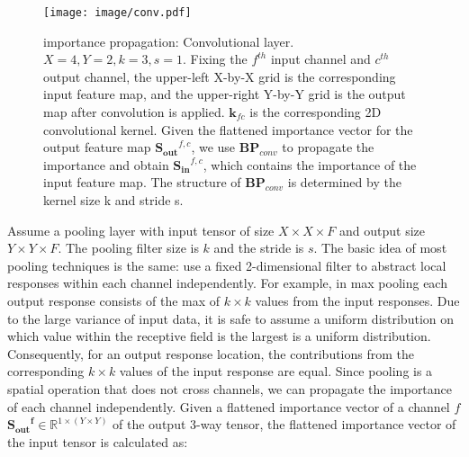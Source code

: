 \documentclass[10pt,twocolumn,letterpaper]{article}
\begin{document}
\begin{figure}[t]
\begin{center}
   \texttt{[image: image/conv.pdf]}
\end{center}
   \caption{importance propagation: Convolutional layer. $X=4, Y=2, k=3, s=1$. Fixing the $f^{th}$ input channel and $c^{th}$ output channel, the upper-left X-by-X grid is the corresponding input feature map, and the upper-right Y-by-Y grid is the output map after convolution is applied. $\mathbf{k}_{fc}$ is the corresponding 2D convolutional kernel. Given the flattened importance vector for the output feature map $\mathbf{S_{out}}^{f,c}$, we use $\mathbf{BP}_{conv}$ to propagate the importance and obtain $\mathbf{S_{in}}^{f,c}$, which contains the importance of the input feature map. The structure of $\mathbf{BP}_{conv}$ is determined by the kernel size k and stride s. }
\label{fig:conv}
\end{figure}%
Assume a pooling layer with input tensor of size $X \times X \times F$ and output size $Y \times Y \times F$.
The pooling filter size is $k$ and the stride is $s$.
The basic idea of most pooling techniques is the same: use a fixed 2-dimensional filter to abstract local responses within each channel independently.
For example, in max pooling each output response consists of the max of $k \times k$ values from the input responses.
Due to the large variance of input data, it is safe to assume a uniform distribution on which value within the receptive field is the largest is a uniform distribution.
Consequently, for an output response location, the contributions from the corresponding $k \times k$ values of the input response are equal. 
Since pooling is a spatial operation that does not cross channels, we can propagate the importance of each channel independently. 
Given a flattened importance vector of a channel $f$$\mathbf{{S_{out}}^f} \in \mathbb{R}^ {1\times (Y \times Y )}$ of the output 3-way tensor, the flattened importance vector of the input tensor is calculated as:
\end{document}
